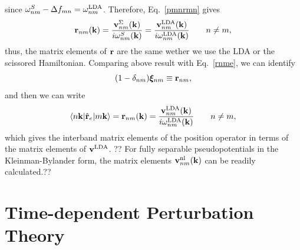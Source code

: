 \documentclass{article}
\begin{document}
since
$\omega^S_{nm}-\Delta f_{mn}=\omega^{\mathrm{LDA}}_{nm}$. Therefore, 
Eq.~\eqref{pmnrmn} gives
\begin{eqnarray}\label{chon.10}
\mathbf{r}_{nm}(\mathbf{k})
=
\frac{\mathbf{v}^\Sigma_{nm}(\mathbf{k})}{i\omega^S_{nm}(\mathbf{k})}
=
\frac{\mathbf{v}^{\mathrm{LDA}}_{nm}(\mathbf{k})}{i\omega^{\mathrm{LDA}}_{nm}(\mathbf{k})}
\quad\quad n\ne m
,
\end{eqnarray}
thus,
the matrix elements
of $\mathbf{r}$ are the same wether we use the LDA or the scissored Hamiltonian.
Comparing above result with Eq.~\eqref{rnme}, 
we can identify 
\begin{equation}\label{xir}
(1-\delta_{nm})\boldsymbol{\xi}_{nm}\equiv \mathbf{r}_{nm}
,
\end{equation}
and then we can write
\begin{equation}\label{chon.98}
\langle n\mathbf{k} |\hat{\mathbf{r}}_e| m\mathbf{k} \rangle =
\mathbf{r}_{nm}(\mathbf{k})=\frac{\mathbf{v}^{\mathrm{LDA}}_{nm}(\mathbf{k})}{i\omega^{\mathrm{LDA}}_{nm}(\mathbf{k})}
\quad\quad n\ne m
,
\end{equation}  
which gives the interband matrix elements of the position operator
in terms of the matrix elements of $\mathbf{v}^{\mathrm{LDA}}$. 
??
For fully  separable pseudopotentials in the 
Kleinman-Bylander form,
\cite{motta_implementation_2010,kleinman_efficacious_1982,adolph_nonlocality_1996}
the matrix elements $\mathbf{v}^{\mathrm{nl}}_{nm}(\mathbf{k})$ can be readily calculated.\cite{francesco}??


\section{Time-dependent Perturbation Theory}\label{tdpt}
\end{document}
